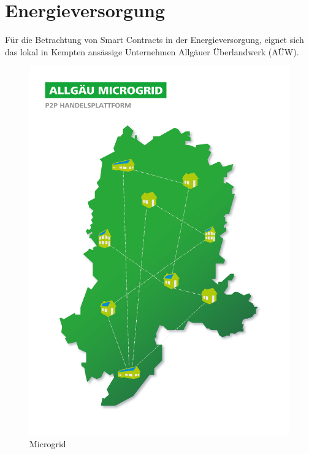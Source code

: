 \chapter{Energieversorgung}
\label{chap:Energieversorgung}
Für die Betrachtung von Smart Contracts in der Energieversorgung, eignet sich das lokal in Kempten ansässige Unternehmen Allgäuer Überlandwerk (AÜW).

\begin{figure}
\centering
  \includegraphics[width=.4\textwidth]{Bilder/Microgrid.png}
  \caption[Microgrid]{Microgrid \cite{AÜW}}
  \label{fig:Microgrid}
\end{figure}

